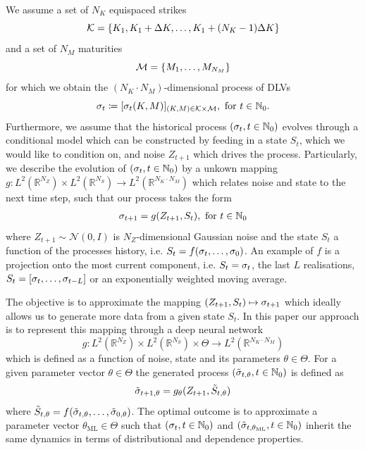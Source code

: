 \documentclass[]{article} %
\begin{document}
We assume a set of $N_K$ equispaced strikes 
\[
\mathcal{K}=\left\lbrace K_1, K_1 + \Delta K, \dots, K_1 + (N_K - 1) \Delta K \right \rbrace
\]
and a set of $N_M$ maturities 
\[
\mathcal{M} = \left\lbrace M_1, \dots, M_{N_M}\right\rbrace
\]
for which we obtain the $(N_K \cdot N_M)$-dimensional process of DLVs 
\begin{equation*}
\sigma_t \coloneqq [\sigma_t(K, M)]_{(K, M) \in \mathcal{K}\times\mathcal{M}}, \ \textrm{for} \ t \in \mathbb{N}_0.
\end{equation*}
Furthermore, we assume that the historical process $(\sigma_{t}, t \in \mathbb{N}_0)$ evolves through a conditional model which can be constructed by feeding in a state $S_t$, which we would like to condition on, and noise $Z_{t+1}$ which drives the process. Particularly, we describe the evolution of $(\sigma_{t}, t \in \mathbb{N}_0)$ by a unkown mapping $g:L^2(\mathbb{R}^{N_Z})\times L^2(\mathbb{R}^{N_S}) \to L^2(\mathbb{R}^{N_K \cdot N_M})$ which relates noise and state to the next time step, such that our process takes the form
\begin{align}
\label{eq:objective}
\sigma_{t+1} = g(Z_{t+1}, S_t), \ \textrm{for} \ t \in \mathbb{N}_0
\end{align}
where $Z_{t+1}\sim \mathcal{N}(0, I)$ is $N_Z$-dimensional Gaussian noise and the state $S_t$ a function of the processes history, i.e. $S_t = f(\sigma_t, \dots, \sigma_0)$. An example of $f$ is a projection onto the most current component, i.e. $S_t = \sigma_t$, the last $L$ realisations, $S_t = [\sigma_t, \dots, \sigma_{t-L}]$ or an exponentially weighted moving average.

The objective is to approximate the mapping $(Z_{t+1}, S_t) \mapsto \sigma_{t+1}$ which ideally allows us to generate more data from a given state $S_t$. In this paper our approach is to represent this mapping through a deep neural network
\[ 
g: L^2\left(\mathbb{R}^{N_Z}\right) \times  L^2\left(\mathbb{R}^{N_S}\right) \times \Theta \to L^2\left(\mathbb{R}^{N_K \cdot N_M}\right)
\]
which is defined as a function of noise, state and its parameters $\theta \in \Theta$. For a given parameter vector $\theta \in \Theta$ the generated process $(\tilde{\sigma}_{t, \theta}, t \in \mathbb{N}_0)$ is defined as
\begin{equation}
\label{eq:dnn_model}
\tilde{\sigma}_{t+1, \theta} = g_\theta(Z_{t+1}, \tilde S_{t, \theta})
\end{equation}
where $\tilde S_{t, \theta} = f(\tilde{\sigma}_{t, \theta}, \dots, \tilde{\sigma}_{0, \theta})$. The optimal outcome is to approximate a parameter vector $\theta_{\textrm{ML}} \in \Theta$ such that $(\sigma_t, t \in \mathbb{N}_0)$ and $(\tilde{\sigma}_{t, \theta_{\textrm{ML}}}, t \in \mathbb{N}_0)$ inherit the same dynamics in terms of distributional and dependence properties.
\end{document}
